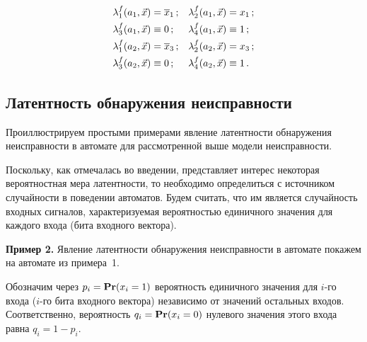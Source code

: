 \begin{multicols}{2}
\vspace*{-24pt}

\noindent
\begin{align*}
\lambda_1^f(a_1,\vec x) &= \overline x_1\,;
&
\lambda_2^f(a_1,\vec x) &= x_1\,;\\
\lambda_3^f(a_1,\vec x) &\equiv 0\,;
&
\lambda_4^f(a_1,\vec x) & \equiv 1\,;
\\
\lambda_1^f(a_2,\vec x) &= \overline x_3\,;
&
\lambda_2^f(a_2,\vec x) &= x_3\,;\\
\lambda_3^f(a_2,\vec x) & \equiv 0\,;
&
\lambda_4^f(a_2,\vec x) &\equiv 1\,.
\end{align*}



\vspace*{-6pt}

\subsection{Латентность обнаружения неисправности}

Проиллюстрируем простыми примерами явление латентности обнаружения
неисправности в автомате для рассмотренной выше модели неисправности.

Поскольку, как отмечалась во введении, представляет интерес некоторая
вероятностная мера латентности, то необходимо определиться с источником
случайности в поведении автоматов.
Будем считать, что им является случайность входных сигналов,
характеризуемая вероятностью единичного значения для каждого входа
(бита входного век\-тора).

\medskip

\noindent
{\bf Пример 2.}
Явление латентности обнаружения неисправности в автомате покажем на
автомате из примера~1.

Обозначим через $p_i={\bf Pr}(x_i=1)$ вероятность единичного значения
для $i$-го входа ($i$-го бита входного вектора) независимо от значений
остальных входов.
Соответственно, вероятность $q_i={\bf Pr}(x_i=0)$ нулевого значения этого
входа равна $q_i=1-p_i$.


\end{multicols}
